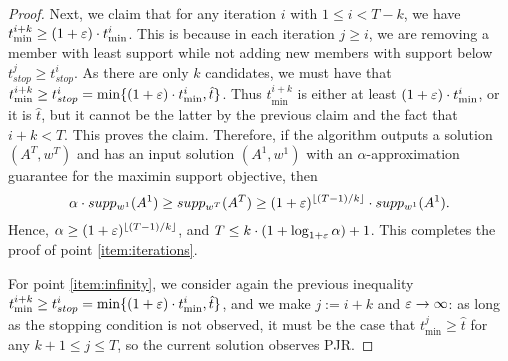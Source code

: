 \begin{proof}
Next, we claim that for any iteration $i$ with $1\leq i<T-k$, we have $t^{i+k}_{\min}\geq (1+\varepsilon)\cdot t^{i}_{\min}$. This is because in each iteration $j\geq i$, we are removing a member with least support while not adding new members with support below $t^j_{stop} \geq t^i_{stop}$. As there are only $k$ candidates, we must have that $t^{i+k}_{\min}\geq t^i_{stop}=\min\{(1+\varepsilon)\cdot t^i_{\min}, \hat{t}\}$. Thus $t^{i+k}_{\min}$ is either at least $(1+\varepsilon)\cdot t^i_{\min}$, or it is $\hat{t}$, but it cannot be the latter by the previous claim and the fact that $i+k<T$. This proves the claim. Therefore, if the algorithm outputs a solution $(A^T,w^T)$ and has an input solution $(A^1, w^1)$ with an $\alpha$-approximation guarantee for the maximin support objective, then 
$$\alpha\cdot supp_{w^1}(A^1) \geq supp_{w^T}(A^T) \geq (1+\varepsilon)^{\lfloor (T-1)/k \rfloor} \cdot supp_{w^1}(A^1).$$
Hence, $\alpha\geq (1+\varepsilon)^{\lfloor (T-1)/k \rfloor}$, and $T\leq k\cdot(1+\log_{1+\varepsilon} \alpha)+1$. This completes the proof of point \ref{item:iterations}.

For point \ref{item:infinity}, we consider again the previous inequality $t^{i+k}_{\min}\geq t^i_{stop}=\min\{(1+\varepsilon)\cdot t^i_{\min}, \hat{t}\}$, and we make $j:=i+k$ and $\varepsilon\rightarrow \infty$: as long as the stopping condition is not observed, it must be the case that $t^{j}_{\min}\geq \hat{t}$ for any $k+1\leq j\leq T$, so the current solution observes PJR.
\end{proof}